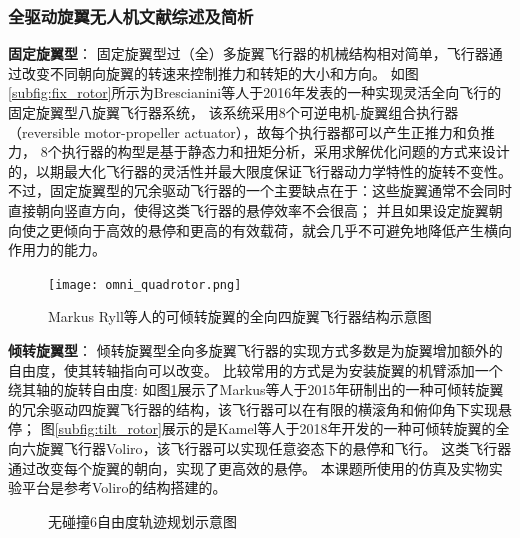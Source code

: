 \subsubsection{全驱动旋翼无人机文献综述及简析}
\textbf{固定旋翼型}：
固定旋翼型过（全）多旋翼飞行器的机械结构相对简单，飞行器通过改变不同朝向旋翼的转速来控制推力和转矩的大小和方向。
如图\ref{subfig:fix_rotor}所示为Brescianini等人于2016年发表的一种实现灵活全向飞行的固定旋翼型八旋翼飞行器系统\cite{brescianini2016design}，
该系统采用8个可逆电机-旋翼组合执行器（reversible motor-propeller actuator），故每个执行器都可以产生正推力和负推力，
8个执行器的构型是基于静态力和扭矩分析，采用求解优化问题的方式来设计的，以期最大化飞行器的灵活性并最大限度保证飞行器动力学特性的旋转不变性。
不过，固定旋翼型的冗余驱动飞行器的一个主要缺点在于：这些旋翼通常不会同时直接朝向竖直方向，使得这类飞行器的悬停效率不会很高；
并且如果设定旋翼朝向使之更倾向于高效的悬停和更高的有效载荷，就会几乎不可避免地降低产生横向作用力的能力\cite{allenspach2020design}。

\begin{figure}[ht]
    \centering
    \texttt{[image: omni\_quadrotor.png]}
    \caption{Markus Ryll等人的可倾转旋翼的全向四旋翼飞行器结构示意图}
    \label{fig:tiltrotor_quadrotor}
\end{figure}

\textbf{倾转旋翼型}：
倾转旋翼型全向多旋翼飞行器的实现方式多数是为旋翼增加额外的自由度，使其转轴指向可以改变。
比较常用的方式是为安装旋翼的机臂添加一个绕其轴的旋转自由度:
如图\ref{fig:tiltrotor_quadrotor}展示了Markus等人于2015年研制出的一种可倾转旋翼的冗余驱动四旋翼飞行器的结构\cite{ryll2014novel}，该飞行器可以在有限的横滚角和俯仰角下实现悬停；
图\ref{subfig:tilt_rotor}展示的是Kamel等人于2018年开发的一种可倾转旋翼的全向六旋翼飞行器Voliro\cite{kamel2018voliro}，该飞行器可以实现任意姿态下的悬停和飞行。
这类飞行器通过改变每个旋翼的朝向，实现了更高效的悬停。
本课题所使用的仿真及实物实验平台是参考Voliro的结构搭建的。

\begin{figure}[!ht]
    \setlength{\subfigcapskip}{-1bp}
    \centering
    \begin{minipage}{\textwidth}

    \centering
    \subfigure{\label{subfig:trajectory_overview}}\addtocounter{subfigure}{-2}
    \subfigure{\label{subfig:simulation}}\addtocounter{subfigure}{-2}

    \end{minipage}
    \caption{无碰撞6自由度轨迹规划示意图\cite{liu2022collision}}
    \label{fig:collision_free_6dof_trajectory}
\end{figure}

